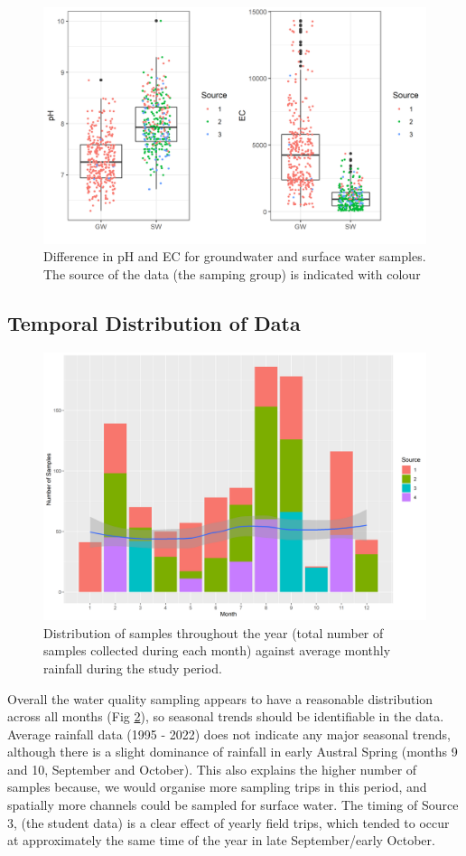 \documentclass[, manuscript]{copernicus}
\begin{document}
\begin{figure}
\includegraphics[width=0.8\linewidth]{Figures/gwsw} \caption{Difference in pH and EC for groundwater and surface water samples. The source of the data (the samping group) is indicated with colour}\label{fig:gw_sw-plot}
\end{figure}

\subsection{Temporal Distribution of Data}

\clearpage

\begin{figure}
\includegraphics[width=0.5\linewidth]{Figures/monthly} \caption{Distribution of samples throughout the year (total number of samples collected during each month) against average monthly rainfall during the study period. }\label{fig:month-plot}
\end{figure}

Overall the water quality sampling appears to have a reasonable
distribution across all months (Fig \ref{fig:month-plot}), so seasonal
trends should be identifiable in the data. Average rainfall data (1995 -
2022) does not indicate any major seasonal trends, although there is a
slight dominance of rainfall in early Austral Spring (months 9 and 10,
September and October). This also explains the higher number of samples
because, we would organise more sampling trips in this period, and
spatially more channels could be sampled for surface water. The timing
of Source 3, (the student data) is a clear effect of yearly field trips,
which tended to occur at approximately the same time of the year in late
September/early October.
\end{document}
